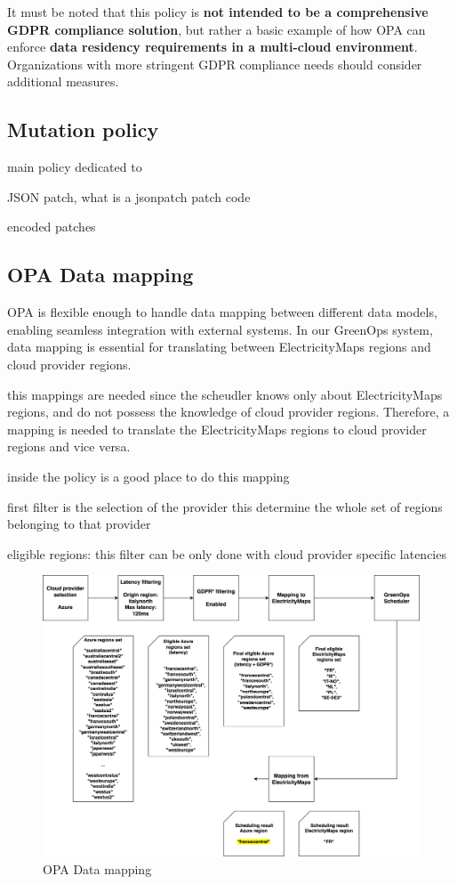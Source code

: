 It must be noted that this policy is \textbf{not intended to be a comprehensive GDPR compliance solution}, but rather a basic example of how OPA can enforce \textbf{data residency requirements in a multi-cloud environment}. Organizations with more stringent GDPR compliance needs should consider additional measures.

\subsection{Mutation policy}

main policy
dedicated to 


JSON patch, what is a jsonpatch
patch code

encoded patches


\subsection{OPA Data mapping}

OPA is flexible enough to handle data mapping between different data models, enabling seamless integration with external systems. In our GreenOps system, data mapping is essential for translating between ElectricityMaps regions and cloud provider regions. 

this mappings are needed since the scheudler knows only about ElectricityMaps regions, and do not possess the knowledge of cloud provider regions. Therefore, a mapping is needed to translate the ElectricityMaps regions to cloud provider regions and vice versa.

inside the policy is a good place to do this mapping


first filter is the selection of the provider
this determine the whole set of regions belonging to that provider

eligible regions: this filter can be only done with cloud provider specific latencies

\begin{figure}[H]
  \centering
  \includegraphics[width=1\linewidth]{images/data_mapping.png}
  \caption{OPA Data mapping}
  \label{fig:data_mapping}
\end{figure}


